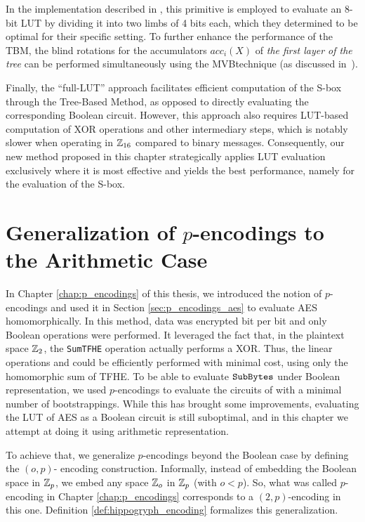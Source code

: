 In the implementation described in \cite{DBLP:conf/wahc/TramaCBS23}, this primitive is employed to evaluate an 8-bit \gls{LUT} by dividing it into two limbs of 4 bits each, which they determined to be optimal for their specific setting. 
%
To further enhance the performance of the \gls{TBM}, the blind rotations for the accumulators $acc_i(X)$ of \emph{the first layer of the tree} can be performed simultaneously using the \gls{MVB}technique (as discussed in~\cite{TCHES:GuiBorAra21}). 

Finally, the ``full-\gls{LUT}'' approach facilitates efficient computation of the S-box through the Tree-Based Method, as opposed to directly evaluating the corresponding Boolean circuit. However, this approach also requires \gls{LUT}-based computation of XOR operations and other intermediary steps, which is notably slower when operating in $\mathbb{Z}_{16}$ compared to binary messages. Consequently, our new method \hippo{} proposed in this chapter strategically applies \gls{LUT} evaluation exclusively where it is most effective and yields the best performance, namely for the evaluation of the S-box.




\section{Generalization of $p$-encodings to the Arithmetic Case}
\label{sec:generalization_p_encodings}

In Chapter \ref{chap:p_encodings} of this thesis, we introduced the notion of $p$-encodings and used it in Section \ref{sec:p_encodings_aes} to evaluate \gls{AES} homomorphically. In this method, data was encrypted bit per bit and only Boolean operations were performed. It leveraged the fact that, in the plaintext space $\mathbb{Z}_2$, the \texttt{SumTFHE} operation actually performs a XOR. Thus, the linear operations \MixColumns and \AddRoundKey could be efficiently performed with minimal cost, using only the homomorphic sum of \gls{TFHE}. To be able to evaluate $\texttt{SubBytes}$ under Boolean representation, we used $p$-encodings to evaluate the circuits of \SubBytes with a minimal number of bootstrappings. While this has brought some improvements, evaluating the \gls{LUT} of \gls{AES} as a Boolean circuit is still suboptimal, and in this chapter we attempt at doing it using arithmetic representation.

To achieve that, we generalize $p$-encodings beyond the Boolean case by defining the $(o, p)$- encoding construction. Informally, instead of embedding the Boolean space in $\mathbb{Z}_p$, we embed any space $\mathbb{Z}_o$ in $\mathbb{Z}_p$ (with $o < p$). So, what was called $p$-encoding in Chapter \ref{chap:p_encodings} corresponds to a $(2, p)$-encoding in this one.
%
Definition \ref{def:hippogryph_encoding} formalizes this generalization.

